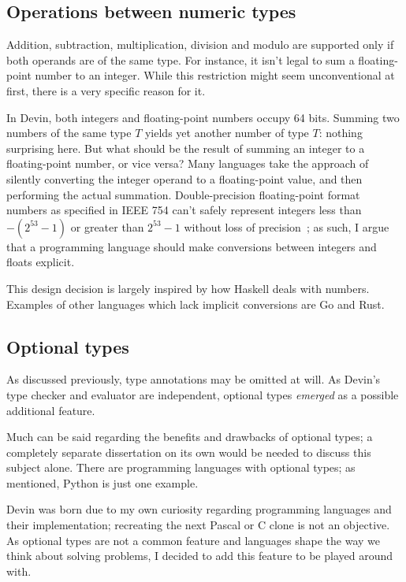 \documentclass[UdineBachThesis,american,11pt]{PhdThesis}
\begin{document}
  \subsection{Operations between numeric types}

  Addition, subtraction, multiplication, division and modulo are supported only
  if both operands are of the same type. For instance, it isn't legal to sum a
  floating-point number to an integer. While this restriction might seem
  unconventional at first, there is a very specific reason for it.

  In Devin, both integers and floating-point numbers occupy 64 bits. Summing two
  numbers of the same type $T$ yields yet another number of type $T$: nothing
  surprising here. But what should be the result of summing an integer to a
  floating-point number, or vice versa? Many languages take the approach of
  silently converting the integer operand to a floating-point value, and then
  performing the actual summation. Double-precision floating-point format
  numbers as specified in IEEE 754 can't safely represent integers less than
  $-\left(2^{53} - 1\right)$ or greater than $2^{53} - 1$ without loss of
  precision~\cite{mdn}; as such, I argue that a programming language should make
  conversions between integers and floats explicit.

  This design decision is largely inspired by how Haskell deals with numbers.
  Examples of other languages which lack implicit conversions are Go and Rust.

  \subsection{Optional types}

  As discussed previously, type annotations may be omitted at will. As Devin's
  type checker and evaluator are independent, optional types \emph{emerged} as a
  possible additional feature.

  Much can be said regarding the benefits and drawbacks of optional types; a
  completely separate dissertation on its own would be needed to discuss this
  subject alone. There are programming languages with optional types; as
  mentioned, Python is just one example.

  Devin was born due to my own curiosity regarding programming languages and
  their implementation; recreating the next Pascal or C clone is not an
  objective. As optional types are not a common feature and languages shape the
  way we think about solving problems, I decided to add this feature to be
  played around with.
\end{document}
